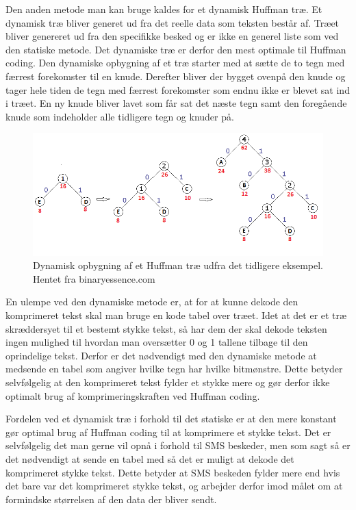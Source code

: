Den anden metode man kan bruge kaldes for et dynamisk Huffman træ. Et dynamisk træ bliver generet ud fra det reelle data som teksten består af. Træet bliver genereret ud fra den specifikke besked og er ikke en generel liste som ved den statiske metode. Det dynamiske træ er derfor den mest optimale til Huffman coding. Den dynamiske opbygning af et træ starter med at sætte de to tegn med færrest forekomster til en knude. Derefter bliver der bygget ovenpå den knude og tager hele tiden de tegn med færrest forekomster som endnu ikke er blevet sat ind i træet. En ny knude bliver lavet som får sat det næste tegn samt den foregående knude som indeholder alle tidligere tegn og knuder på.

\begin{figure}[H]
\centering
\includegraphics[width=\linewidth]{Billeder/dynamisk.png}
\caption{Dynamisk opbygning af et Huffman træ udfra det tidligere eksempel. Hentet fra binaryessence.com\cite{Hufftree_1}}
\label{fig:dynamic_tree}
\end{figure}

En ulempe ved den dynamiske metode er, at for at kunne dekode den komprimeret tekst skal man bruge en kode tabel over træet. Idet at det er et træ skræddersyet til et bestemt stykke tekst, så har dem der skal dekode teksten ingen mulighed til hvordan man oversætter 0 og 1 tallene tilbage til den oprindelige tekst. Derfor er det nødvendigt med den dynamiske metode at medsende en tabel som angiver hvilke tegn har hvilke bitmønstre. Dette betyder selvfølgelig at den komprimeret tekst fylder et stykke mere og gør derfor ikke optimalt brug af komprimeringskraften ved Huffman coding. \cite{Hufftree_4}

Fordelen ved et dynamisk træ i forhold til det statiske er at den mere konstant gør optimal brug af Huffman coding til at komprimere et stykke tekst. Det er selvfølgelig det man gerne vil opnå i forhold til SMS beskeder, men som sagt så er det nødvendigt at sende en tabel med så det er muligt at dekode det komprimeret stykke tekst. Dette betyder at SMS beskeden fylder mere end hvis det bare var det komprimeret stykke tekst, og arbejder derfor imod målet om at formindske størrelsen af den data der bliver sendt.
